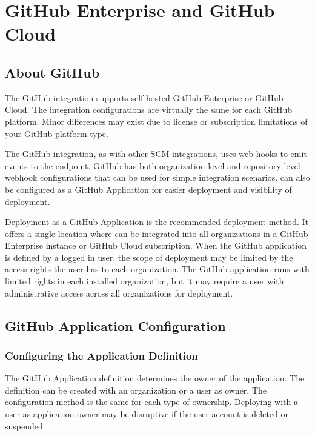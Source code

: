 \chapter{GitHub Enterprise and GitHub Cloud}

\section{About GitHub}

The GitHub integration supports self-hosted GitHub Enterprise or GitHub Cloud.  The integration configurations
are virtually the same for each GitHub platform.  Minor differences may exist due to license or subscription
limitations of your GitHub platform type.  

The GitHub integration, as with other SCM integrations, uses web hooks to emit events to the \cxoneflow endpoint.
GitHub has both organization-level and repository-level webhook configurations
that can be used for simple integration scenarios.  \cxoneflow can also be configured as a GitHub Application
for easier deployment and visibility of deployment.

Deployment as a GitHub Application is the recommended deployment method.  It offers a single location where
\cxoneflow can be integrated into all organizations in a GitHub Enterprise instance or GitHub Cloud subscription.
When the GitHub application is defined by a logged in user, the scope of deployment may be limited by the access rights
the user has to each organization.  The \cxoneflow GitHub application runs with limited rights in each installed
organization, but it may require a user with administrative access across all organizations for deployment.


\section{GitHub Application Configuration}

\subsection{Configuring the Application Definition}

The GitHub Application definition determines the owner of the application.  The definition can
be created with an organization or a user as owner.  The configuration method is the same
for each type of ownership.  Deploying with a user as application owner may be disruptive if the user
account is deleted or suspended.


